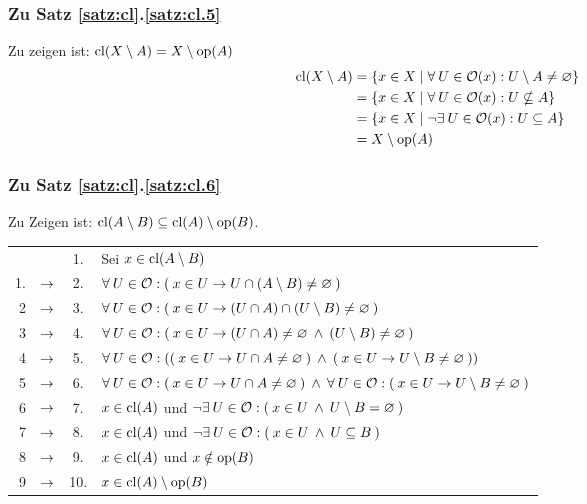         
\subsubsection{Zu Satz \ref{satz:cl}.\ref{satz:cl.5}} 
    Zu zeigen ist: $\text{cl}(X \setminus A) = X \setminus \text{op}(A)$ \\
    \begin{align*}
        \text{cl}(X \setminus A)
        &= \{x \in X \mid \forall\: U \in \mathcal{O}(x) : U \setminus A \neq \varnothing \}\\
        &= \{x \in X \mid \forall\: U \in \mathcal{O}(x) : U \nsubseteq A \}\\
        &= \{x \in X \mid \neg \exists\: U \in \mathcal{O}(x) : U \subseteq A \}\\
        &= X \setminus \text{op}(A)
    \end{align*}


\subsubsection{Zu Satz \ref{satz:cl}.\ref{satz:cl.6}}
    Zu Zeigen ist: $\text{cl}(A \setminus B) \subseteq \text{cl}(A) \setminus \text{op}(B)$.\\

    \begin{longtable}{r c c l}
        & & 1. & Sei $x \in \text{cl}(A \setminus B)$ \\
        1. & $\rightarrow$ & 2. & $\forall\: U \in \mathcal{O} : (\: x \in U \to U \cap (A \setminus B) \neq \varnothing \:)$ \\
        2 & $\rightarrow$ & 3. & $\forall\: U \in \mathcal{O} : (\: x \in U \to (U \cap A) \cap (U \setminus B) \neq \varnothing \:)$ \\
        3 & $\rightarrow$ & 4. & $\forall\: U \in \mathcal{O} : (\: x \in U \to (U \cap A) \neq \varnothing \:\land\: (U \setminus B) \neq \varnothing \:)$ \\
        4 & $\rightarrow$ & 5. & $\forall\: U \in \mathcal{O} : ( (\: x \in U \to U \cap A \neq \varnothing \:) \:\land\: (\: x \in U \to U \setminus B \neq \varnothing \:))$ \\
        5 & $\rightarrow$ & 6. & $\forall\: U \in \mathcal{O} : (\: x \in U \to U \cap A \neq \varnothing \:) \:\land\: \forall\: U \in \mathcal{O} : (\: x \in U \to U \setminus B \neq \varnothing \:)$ \\
        6 & $\rightarrow$ & 7. & $x \in \text{cl}(A)$ und $\neg \exists\: U \in \mathcal{O} : (\: x \in U \:\land\: U \setminus B = \varnothing \:)$ \\
        7 & $\rightarrow$ & 8. & $x \in \text{cl}(A)$ und $\neg \exists\: U \in \mathcal{O} : (\: x \in U \:\land\: U \subseteq B \:)$ \\
        8 & $\rightarrow$ & 9. & $x \in \text{cl}(A)$ und $x \notin \text{op}(B)$ \\
        9 & $\rightarrow$ & 10. & $x \in \text{cl}(A) \setminus \text{op}(B)$ \\
    \end{longtable}


